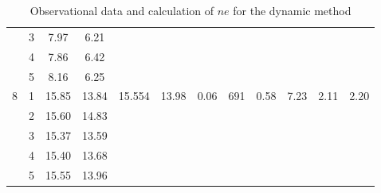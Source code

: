 \begin{table*}[]
{\begin{tabular}{|c|c|c|c|c|c|c|c|c|c|c|c|}
     & 3 & 7.97 & 6.21 &  &  &  &  &  &  &  &  \\ \cline{2-4}
     & 4 & 7.86 & 6.42 &  &  &  &  &  &  &  &  \\ \cline{2-4}
     & 5 & 8.16 & 6.25 &  &  &  &  &  &  &  &  \\ \hline
    \multirow{5}{*}{8} & 1 & 15.85 & 13.84 & \multirow{5}{*}{15.554} & \multirow{5}{*}{13.98} & \multirow{5}{*}{0.06} & \multirow{5}{*}{691} & \multirow{5}{*}{0.58} & \multirow{5}{*}{7.23} & \multirow{5}{*}{2.11} & \multirow{5}{*}{2.20} \\ \cline{2-4}
     & 2 & 15.60 & 14.83 &  &  &  &  &  &  &  &  \\ \cline{2-4}
     & 3 & 15.37 & 13.59 &  &  &  &  &  &  &  &  \\ \cline{2-4}
     & 4 & 15.40 & 13.68 &  &  &  &  &  &  &  &  \\ \cline{2-4}
     & 5 & 15.55 & 13.96 &  &  &  &  &  &  &  &  \\ \hline
    \end{tabular}%
    }
    \caption{Observational data and calculation of $ne$ for the dynamic method}
    \label{obs1}    
\end{table*}
